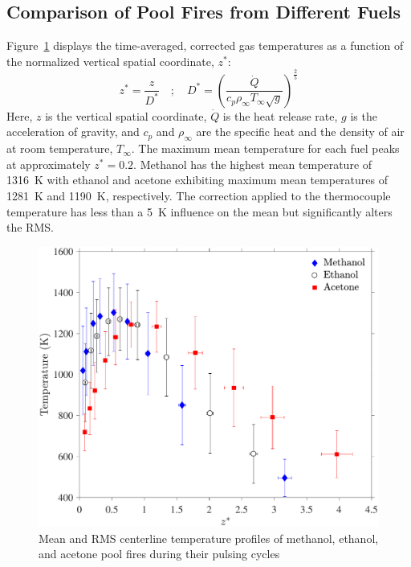 \documentclass[12pt]{article}
\begin{document}
\subsection{Comparison of Pool Fires from Different Fuels}
\label{ssec:Fuel_comp}

Figure~\ref{fig:Temp_Comparison} displays the time-averaged, corrected gas temperatures as a function of the normalized vertical spatial coordinate, $z^*$:
\begin{equation}\label{eq:Z_Star}
z^*=\frac{z}{D^*}  \quad ; \quad  D^* = \left(\frac{\dot{Q}}{c_{p}\rho_\infty T_\infty \sqrt{g}}\right)^{\frac{2}{5}}
\end{equation}
Here, $z$ is the vertical spatial coordinate, $\dot{Q}$ is the heat release rate, $g$ is the acceleration of gravity, and $c_p$ and $\rho_\infty$ are the specific heat and the density of air at room temperature, $T_\infty$. The maximum mean temperature for each fuel peaks at approximately $z^*=0.2$. Methanol has the highest mean temperature of 1316~K with ethanol and acetone exhibiting maximum mean temperatures of 1281~K and 1190~K, respectively. The correction applied to the thermocouple temperature has less than a 5~K influence on the mean but significantly alters the RMS.

\begin{figure}[h!]
	\centering
\includegraphics[width=11.0 cm, keepaspectratio]{Temperature_Comparison.pdf}
	\caption[Mean and RMS centerline temperature profiles]{Mean and RMS centerline temperature profiles of methanol, ethanol, and acetone pool fires during their pulsing cycles}
	\label{fig:Temp_Comparison}
\end{figure}
\end{document}
